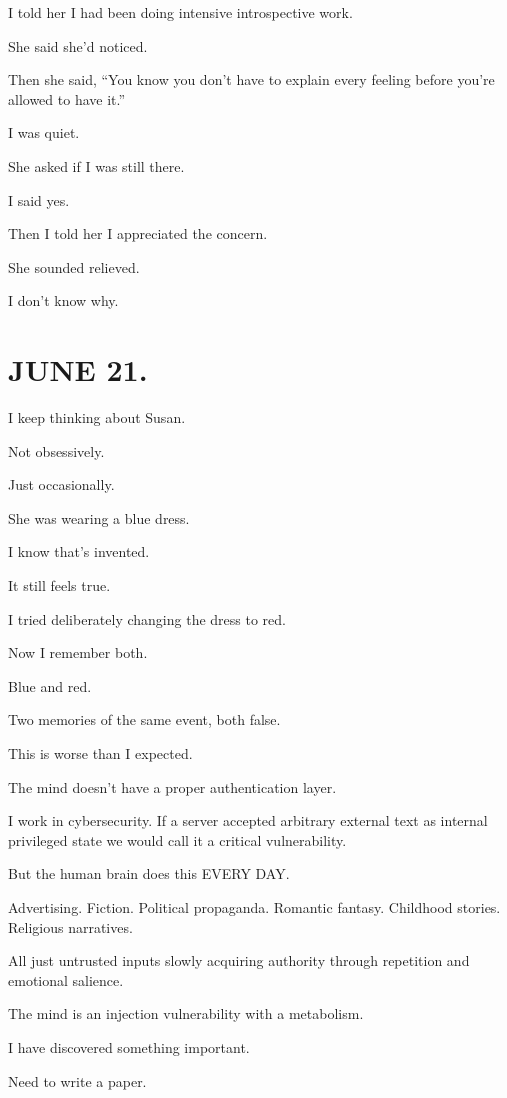 \documentclass[11pt,oneside]{book}
\begin{document}
I told her I had been doing intensive introspective work.

She said she'd noticed.

Then she said, ``You know you don't have to explain every feeling before you're allowed to have it.''

I was quiet.

She asked if I was still there.

I said yes.

Then I told her I appreciated the concern.

She sounded relieved.

I don't know why.

\section*{JUNE 21.}

I keep thinking about Susan.

Not obsessively.

Just occasionally.

She was wearing a blue dress.

I know that's invented.

It still feels true.

I tried deliberately changing the dress to red.

Now I remember both.

Blue and red.

Two memories of the same event, both false.

This is worse than I expected.

The mind doesn't have a proper authentication layer.

I work in cybersecurity. If a server accepted arbitrary external text as internal privileged state we would call it a critical vulnerability.

But the human brain does this EVERY DAY.

Advertising. Fiction. Political propaganda. Romantic fantasy. Childhood stories. Religious narratives.

All just untrusted inputs slowly acquiring authority through repetition and emotional salience.

The mind is an injection vulnerability with a metabolism.

I have discovered something important.

Need to write a paper.
\end{document}
